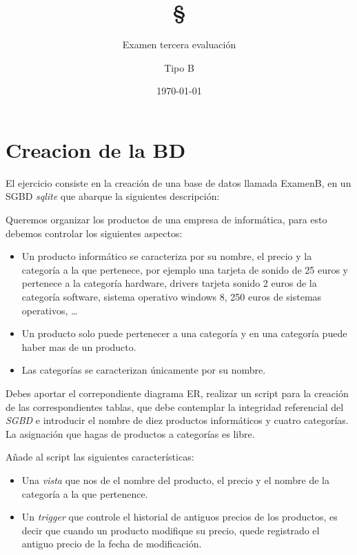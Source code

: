 \documentclass[4paper]{article}
\author{Examen tercera evaluación}
\author{Tipo B}
\title{\textbf{\S}}
\date{\today}
\begin{document}
\maketitle 
\section*{Creacion de la BD}
El ejercicio consiste en la creación de una base de datos llamada ExamenB, en un SGBD \emph{sqlite} que abarque la siguientes descripción:\par 
Queremos organizar los productos de una empresa de informática, para esto debemos controlar los siguientes aspectos:
\begin{itemize}
\item Un producto informático se caracteriza por su nombre, el precio y la categoría a la que pertenece, por ejemplo una tarjeta de sonido de 25 euros y pertenece a la categoría hardware, drivers tarjeta sonido 2 euros de la categoría software, sistema operativo windows 8, 250 euros de sistemas operativos, \dots
\item Un producto solo puede pertenecer a una categoría y en una categoría puede haber mas de un producto.
\item Las categorías se caracterizan únicamente por su nombre. 
\end{itemize}
Debes aportar el correpondiente diagrama ER, realizar un script para la creación de las correspondientes tablas, que debe contemplar la integridad referencial del \emph{SGBD} e introducir el nombre de diez productos informáticos y cuatro categorías. La asignación que hagas de productos a categorías es libre.\par 
Añade al script las siguientes características:
\begin{itemize}
\item Una \emph{vista} que nos de el nombre del producto, el precio  y el nombre de la categoría a la que pertenence.
\item Un \emph{trigger} que controle el historial de antiguos precios de los productos, es decir que cuando un producto modifique su precio, quede registrado el antiguo precio de la fecha de modificación.
\end{itemize}
\end{document}
